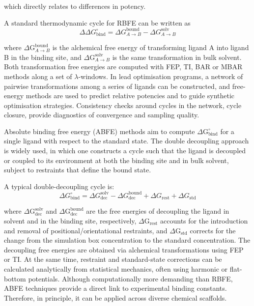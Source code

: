 \documentclass[12pt]{article}
\begin{document}
which directly relates to differences in potency. 

A standard thermodynamic cycle for RBFE can be written as
\begin{equation}
\Delta\Delta G^\circ_\mathrm{bind}
= \Delta G_{A\to B}^{\mathrm{bound}} 
- \Delta G_{A\to B}^{\mathrm{solv}}
\end{equation}

where $\Delta \textrm{G}_{A\to B}^{\textrm{bound}}$ is the alchemical free energy of transforming ligand A into ligand B in the binding site, and $\Delta \textrm{G}_{A\to B}^{\textrm{solv}}$ is the same transformation in bulk solvent\cite{CH10_wang2015accurate}. Both transformation free energies are computed with FEP, TI, BAR or MBAR methods along a set of $\lambda$-windows. In lead optimisation programs, a network of pairwise transformations among a series of ligands can be constructed, and free-energy methods are used to predict relative potencies\cite{CH10_wang2015accurate,CH10_aldeghi2018accurate} and to guide synthetic optimisation strategies. Consistency checks around cycles in the network, cycle closure, provide diagnostics of convergence and sampling quality. 

Absolute binding free energy (ABFE) methods aim to compute $\Delta \textrm{G}^\circ_\textrm{bind}$ for a single ligand with respect to the standard state. The double decoupling approach is widely used, in which one constructs a cycle such that the ligand is decoupled or coupled to its environment at both the binding site and in bulk solvent, subject to restraints that define the bound state\cite{CH10_gilson1997calculation,CH10_deng2009abfe}. 

A typical double-decoupling cycle is:
\begin{equation}
\Delta G^\circ_\mathrm{bind}
= \Delta G_\mathrm{dec}^{\mathrm{solv}} 
- \Delta G_\mathrm{dec}^{\mathrm{bound}}
+ \Delta G_\mathrm{rest}
+ \Delta G_\mathrm{std}
\end{equation}

where $\Delta \textrm{G}_\textrm{dec}^{\textrm{solv}}$ and $\Delta \textrm{G}_\textrm{dec}^{\textrm{bound}}$ are the free energies of decoupling the ligand in solvent and in the binding site, respectively, $\Delta \textrm{G}_\textrm{rest}$ accounts for the introduction and removal of positional/orientational restraints, and $\Delta \textrm{G}_\textrm{std}$ corrects for the change from the simulation box concentration to the standard concentration. The decoupling free energies are obtained via alchemical transformations using FEP or TI. At the same time, restraint and standard-state corrections can be calculated analytically from statistical mechanics, often using harmonic or flat-bottom potentials\cite{CH10_gilson1997calculation,CH10_deng2009abfe,CH10_choderamobley2011perspective}. Although computationally more demanding than RBFE, ABFE techniques provide a direct link to experimental binding constants. Therefore, in principle, it can be applied across diverse chemical scaffolds. 
\end{document}
